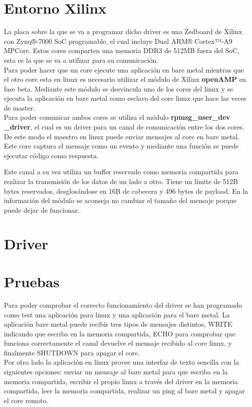 \documentclass[11pt]{article}
\begin{document}
\section{Entorno Xilinx}

La placa sobre la que se va a programar dicho driver es una Zedboard de Xilinx con Zynq®-7000 SoC programable, el cual incluye Dual ARM® Cortex™-A9 MPCore. Estos cores comparten una memoria DDR3 de 512MB fuera del SoC, esta es la que se va a utilizar para su comunicación.\\

\noindent Para poder hacer que un core ejecute una aplicación en bare metal mientras que el otro core esta en linux es necesario utilizar el módulo de Xilinx \textbf{openAMP} en fase beta. Mediante este módulo se desvincula uno de los cores del linux y se ejecuta la aplicación en bare metal como esclavo del core linux que hace las veces de master.\\

\noindent Para poder comunicar ambos cores se utiliza el módulo \textbf{rpmsg\_user\_dev \_driver}, el cual es un driver para un canal de comunicación entre los dos cores. De este modo el maestro en linux puede enviar mensajes al core en bare metal. Este core captura el mensaje como un evento y mediante una función se puede ejecutar código como respuesta. 

\clearpage 

\noindent Este canal a su vez utiliza un buffer reservado como memoria compartida para realizar la transmisión de los datos de un lado a otro. Tiene un límite de 512B bytes reservados, desglosándose en 16B de cabecera y 496 bytes de payload. En la información del módulo se aconseja no cambiar el tamaño del mensaje porque puede dejar de funcionar.

\section{Driver}

\section{Pruebas}
Para poder comprobar el correcto funcionamiento del driver se han programado como test una aplicación para linux y una aplicación para el bare metal. La aplicación bare metal puede recibir tres tipos de mensajes distintos, WRITE indicando que escriba en la memoria compartida, ECHO para comprobar que funciona correctamente el canal devuelve el mensaje recibido al core linux, y finalmente SHUTDOWN para apagar el core.\\

\noindent Por otro lado la aplicación en linux provee una interfaz de texto sencilla con la siguientes opciones: enviar un mensaje al bare metal para que escriba en la memoria compartida, escribir el propio linux a través del driver en la memoria compartida, leer la memoria compartida, realizar un ping al bare metal y apagar el core remoto.\\
\end{document}
